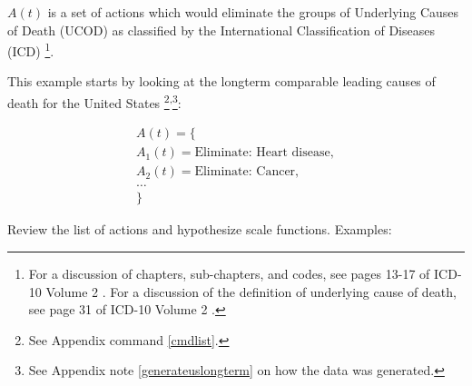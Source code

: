 \documentclass[10pt, a4paper, twocolumn]{IEEEconf}
\newcommand\footnotesstartsep{}
\newcommand\footnotescontinue{\textsuperscript{,}}
\begin{document}
$A(t)$ is a set of actions which would eliminate the groups of Underlying Causes of Death (UCOD) as classified by the International Classification of Diseases (ICD) \citep{icd10vol1,icd10vol2,icd10vol3}\footnotesstartsep\footnote{For a discussion of chapters, sub-chapters, and codes, see pages 13-17 of ICD-10 Volume 2 \citep{icd10vol2}.
For a discussion of the definition of underlying cause of death, see page 31 of ICD-10 Volume 2 \citep{icd10vol2}.}.

This example starts by looking at the longterm comparable leading causes of death for the United States \citep{uslcod19001998,uspopulation19002001,centers2017underlying,nbermortality,censusestimates19001999}\footnotesstartsep\footnote{See Appendix command \ref{cmdlist}.}\footnotescontinue\footnote{See Appendix note \ref{generateuslongterm} on how the data was generated.}:

\begin{equation*}
  \begin{gathered}
    A(t) = \{\\
    A_1(t) = \textrm{Eliminate: Heart disease},\\
    A_2(t) = \textrm{Eliminate: Cancer},\\
    \textrm{\ldots}\\
    \}
  \end{gathered}
\end{equation*}

Review the list of actions and hypothesize scale functions. Examples:
\end{document}
